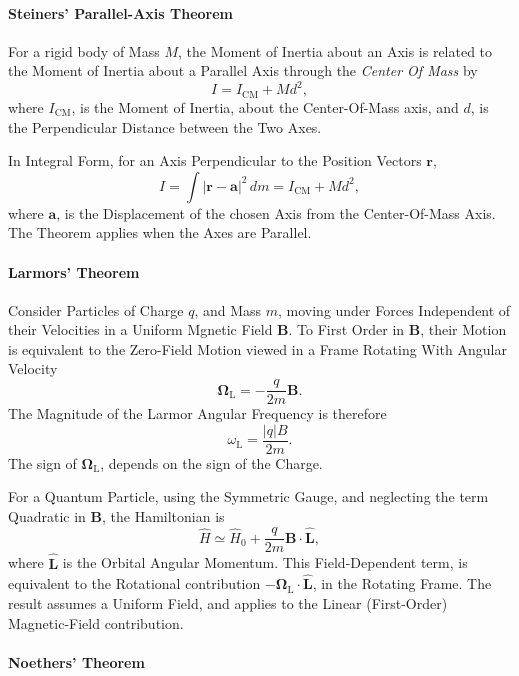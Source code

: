 \documentclass[a4paper, 10pt, onepage]{elegantbook}
\begin{document}
{\paragraph{Steiners' Parallel-Axis Theorem}

For a rigid body of Mass $M$, 
the Moment of Inertia about an Axis is related to the Moment of Inertia about a Parallel Axis through the \emph{Center 
Of Mass} by
\[
I=I_{\mathrm{CM}}+Md^2,
\]
where $I_{\mathrm{CM}}$, is the Moment of Inertia, about the Center-Of-Mass axis, and $d$,
 is the Perpendicular Distance between the Two Axes.  

In Integral Form, for an Axis Perpendicular to the Position Vectors $\mathbf{r}$,
\[
I=\int |\mathbf{r}-\mathbf{a}|^2\,dm
=I_{\mathrm{CM}}+Md^2,
\]
where $\mathbf{a}$, is the Displacement of the chosen Axis from the Center-Of-Mass Axis.
 The Theorem applies when the Axes are Parallel.

\paragraph{Larmors' Theorem}

\noindent

Consider Particles of Charge $q$, and Mass $m$, moving under Forces Independent of their Velocities in a Uniform 
Mgnetic Field $\mathbf{B}$. To First Order in $\mathbf{B}$, their Motion is equivalent to the Zero-Field Motion viewed 
in a Frame Rotating With Angular Velocity
\[
\boldsymbol{\Omega}_{\mathrm{L}}
=
-\frac{q}{2m}\mathbf{B}.
\]
The Magnitude of the Larmor Angular Frequency is therefore
\[
\omega_{\mathrm{L}}=\frac{|q|B}{2m}.
\]
The sign of $\boldsymbol{\Omega}_{\mathrm{L}}$, depends on the sign of the Charge.  

For a Quantum Particle, using the Symmetric Gauge, and neglecting the
term Quadratic in $\mathbf{B}$, the Hamiltonian is
\[
\hat{H}
\simeq
\hat{H}_0+\frac{q}{2m}\mathbf{B}\cdot\hat{\mathbf{L}},
\]
where $\hat{\mathbf{L}}$ is the Orbital Angular Momentum. This Field-Dependent term, is equivalent to the Rotational 
contribution $-\boldsymbol{\Omega}_{\mathrm{L}}\cdot\hat{\mathbf{L}}$, in the Rotating Frame. The result assumes a 
Uniform Field, and applies to the Linear (First-Order) Magnetic-Field contribution.

\paragraph{Noethers' Theorem}

\noindent

}
\end{document}

